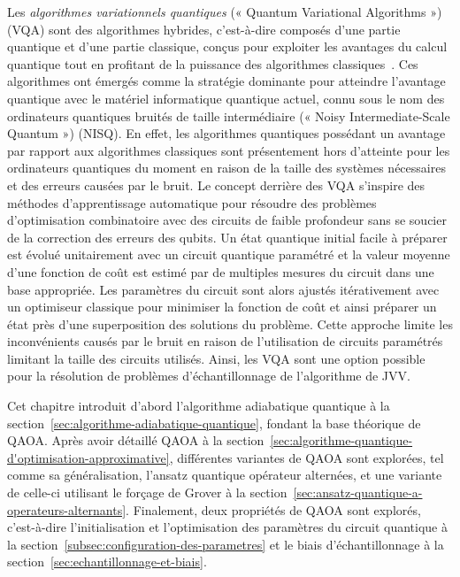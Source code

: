 Les \textit{algorithmes variationnels quantiques} (« Quantum Variational Algorithms ») (VQA) sont des algorithmes hybrides, c'est-à-dire composés d'une partie quantique et d'une partie classique, conçus pour exploiter les avantages du calcul quantique tout en profitant de la puissance des algorithmes classiques~\cite{cerezoVariationalQuantumAlgorithms2021}. Ces algorithmes ont émergés comme la stratégie dominante pour atteindre l'avantage quantique avec le matériel informatique quantique actuel, connu sous le nom des ordinateurs quantiques bruités de taille intermédiaire (« Noisy Intermediate-Scale Quantum ») (NISQ). En effet, les algorithmes quantiques possédant un avantage par rapport aux algorithmes classiques sont présentement hors d'atteinte pour les ordinateurs quantiques du moment en raison de la taille des systèmes nécessaires et des erreurs causées par le bruit. Le concept derrière des VQA s'inspire des méthodes d'apprentissage automatique pour résoudre des problèmes d'optimisation combinatoire avec des circuits de faible profondeur sans se soucier de la correction des erreurs des qubits. Un état quantique initial facile à préparer est évolué unitairement avec un circuit quantique paramétré et la valeur moyenne d'une fonction de coût est estimé par de multiples mesures du circuit dans une base appropriée. Les paramètres du circuit sont alors ajustés itérativement avec un optimiseur classique pour minimiser la fonction de coût et ainsi préparer un état près d'une superposition des solutions du problème. Cette approche limite les inconvénients causés par le bruit en raison de l'utilisation de circuits paramétrés limitant la taille des circuits utilisés. Ainsi, les VQA sont une option possible pour la résolution de problèmes d'échantillonnage de l'algorithme de JVV.


Cet chapitre introduit d'abord l'algorithme adiabatique quantique à la section~\ref{sec:algorithme-adiabatique-quantique}, fondant la base théorique de QAOA. Après avoir détaillé QAOA à la section~\ref{sec:algorithme-quantique-d'optimisation-approximative}, différentes variantes de QAOA sont explorées, tel comme sa généralisation, l'ansatz quantique  opérateur alternées, et une variante de celle-ci utilisant le forçage de Grover à la section~\ref{sec:ansatz-quantique-a-operateurs-alternants}. Finalement, deux propriétés de QAOA sont explorés, c'est-à-dire l'initialisation et l'optimisation des paramètres du circuit quantique à la section~\ref{subsec:configuration-des-parametres} et le biais d'échantillonnage à la section~\ref{sec:echantillonnage-et-biais}.

